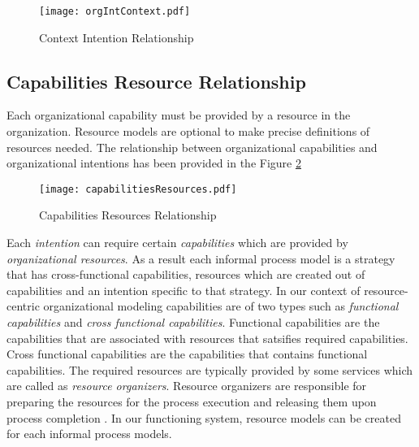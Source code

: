 \begin{figure}
	\centering
	\texttt{[image: orgIntContext.pdf]}
	\caption{Context Intention Relationship}
	\label{fig:orgIntentions}
\end{figure}

\subsection{Capabilities Resource Relationship}
\label{sec:capIntRel}
Each organizational capability must be provided by a resource in the organization. Resource models are optional to make precise definitions of resources needed. The relationship between organizational capabilities and organizational intentions has been provided in the Figure \ref{fig:capabilitiesresources}
 
\begin{figure}
	\centering
	\texttt{[image: capabilitiesResources.pdf]}
	\caption{Capabilities Resources Relationship}
	\label{fig:capabilitiesresources}
\end{figure}

Each \textit{intention} can require certain \textit{capabilities} which are provided by \textit{organizational resources}. 
As a result each informal process model is a strategy that has cross-functional capabilities, resources which are created out of capabilities and an intention specific to that strategy. In our context of resource-centric organizational modeling capabilities are of two types such as \textit{functional capabilities} and \textit{cross functional capabilities}. Functional capabilities are the capabilities that are associated with resources that satsifies required capabilities. Cross functional capabilities are the capabilities that contains functional capabilities. The required resources are typically provided by some services which are called as \textit{resource organizers}. Resource organizers are responsible for preparing the resources for the process execution and releasing them upon process completion \cite{Sungur2014a}. In our functioning system, resource models can be created for each informal process models. 

